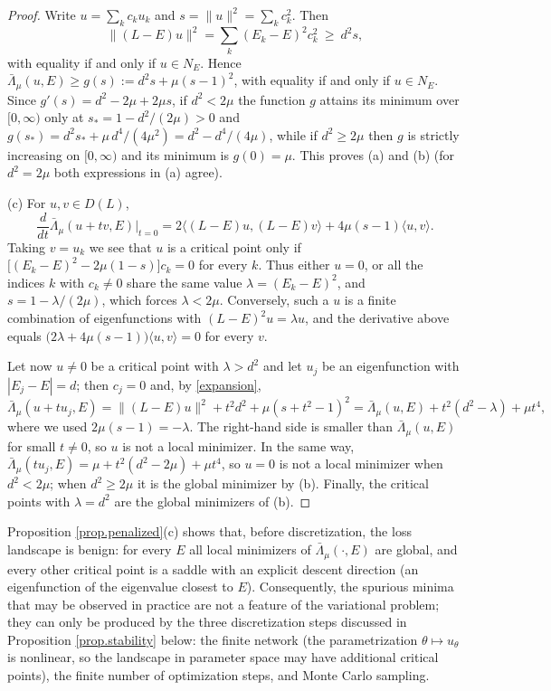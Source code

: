 \begin{proof}
Write $u=\sum_k c_ku_k$ and $s=\|u\|^2=\sum_kc_k^2$. Then
\begin{equation}\label{expansion}
\|(L-E)u\|^2=\sum_k (E_k-E)^2c_k^2\ \ge\ d^2 s ,
\end{equation}
with equality if and only if $u\in N_E$. Hence
$\bar\Lambda_\mu(u,E)\ge g(s):=d^2s+\mu(s-1)^2$, with equality if and only if $u\in N_E$.
Since $g'(s)=d^2-2\mu+2\mu s$, if $d^2<2\mu$ the function $g$ attains its minimum over
$[0,\infty)$ only at $s_*=1-d^2/(2\mu)>0$ and
$g(s_*)=d^2s_*+\mu\,d^4/(4\mu^2)=d^2-d^4/(4\mu)$, while if $d^2\ge2\mu$ then $g$ is
strictly increasing on $[0,\infty)$ and its minimum is $g(0)=\mu$. This proves (a) and (b)
(for $d^2=2\mu$ both expressions in (a) agree).

(c) For $u,v\in D(L)$,
\[
\frac{d}{dt}\bar\Lambda_\mu(u+tv,E)\Big|_{t=0}
=2\langle (L-E)u,(L-E)v\rangle+4\mu(s-1)\langle u,v\rangle .
\]
Taking $v=u_k$ we see that $u$ is a critical point only if
$\big[(E_k-E)^2-2\mu(1-s)\big]c_k=0$ for every $k$. Thus either $u=0$, or all the indices
$k$ with $c_k\neq0$ share the same value $\lambda=(E_k-E)^2$, and
$s=1-\lambda/(2\mu)$, which forces $\lambda<2\mu$. Conversely, such a $u$ is a finite
combination of eigenfunctions with $(L-E)^2u=\lambda u$, and the derivative above equals
$\big(2\lambda+4\mu(s-1)\big)\langle u,v\rangle=0$ for every $v$.

Let now $u\ne0$ be a critical point with $\lambda>d^2$ and let $u_j$ be an eigenfunction
with $|E_j-E|=d$; then $c_j=0$ and, by \eqref{expansion},
\[
\bar\Lambda_\mu(u+tu_j,E)=\|(L-E)u\|^2+t^2d^2+\mu(s+t^2-1)^2
=\bar\Lambda_\mu(u,E)+t^2(d^2-\lambda)+\mu t^4,
\]
where we used $2\mu(s-1)=-\lambda$. The right-hand side is smaller than
$\bar\Lambda_\mu(u,E)$ for small $t\neq0$, so $u$ is not a local minimizer. In the same
way, $\bar\Lambda_\mu(tu_j,E)=\mu+t^2(d^2-2\mu)+\mu t^4$, so $u=0$ is not a local minimizer
when $d^2<2\mu$; when $d^2\ge2\mu$ it is the global minimizer by (b). Finally, the critical
points with $\lambda=d^2$ are the global minimizers of (b).
\end{proof}

\begin{remark}\label{rem.nospurious}
Proposition \ref{prop.penalized}(c) shows that, before discretization, the loss landscape
is benign: for every $E$ all local minimizers of $\bar\Lambda_\mu(\cdot,E)$ are global, and
every other critical point is a saddle with an explicit descent direction (an
eigenfunction of the eigenvalue closest to $E$). Consequently, the spurious minima that
may be observed in practice are not a feature of the variational problem; they can only
be produced by the three discretization steps discussed in Proposition
\ref{prop.stability} below: the finite network (the parametrization
$\theta\mapsto u_\theta$ is nonlinear, so the landscape in parameter space may have
additional critical points), the finite number of optimization steps, and Monte Carlo
sampling.
\end{remark}

